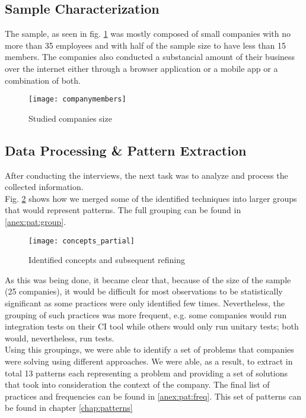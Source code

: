       \subsection{Sample Characterization}
      The sample, as seen in fig. \ref{fig:companymembers} was mostly composed of small companies with no more than 35 employees and with half of the sample size to have less than 15 members. The companies also conducted a substancial amount of their business over the internet either through a browser application or a mobile app or a combination of both.
      \begin{figure}
        \texttt{[image: companymembers]}
        \caption{Studied companies size}
        \label{fig:companymembers}
      \end{figure}
      \subsection{Data Processing \& Pattern Extraction}
      After conducting the interviews, the next task was to analyze and process the collected information.\\
      Fig. \ref{fig:concepts} shows how we merged some of the identified techniques into larger groups that would represent patterns. The full grouping can be found in \ref{anex:pat:group}.\\
      \begin{figure}
        \centering
        \texttt{[image: concepts\_partial]}
        \caption{Identified concepts and subsequent refining}
        \label{fig:concepts}
      \end{figure}
      As this was being done, it became clear that, because of the size of the sample (25 companies), it would be difficult for most observations to be statistically significant as some practices were only identified few times. Nevertheless, the grouping of such practices was more frequent, e.g. some companies would run integration tests on their CI tool while others would only run unitary tests; both would, nevertheless, run tests. \\
      Using this groupings, we were able to identify a set of problems that companies were solving using different approaches. We were able, as a result, to extract in total 13 patterns each representing a problem and providing a set of solutions that took into consideration the context of the company. The final list of practices and frequencies can be found in \ref{anex:pat:freq}.
      This set of patterns can be found in chapter \ref{chap:patterns}
